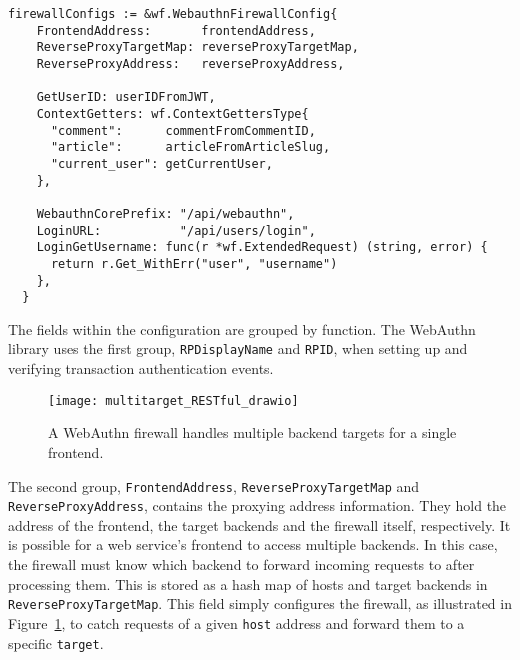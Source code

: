 \begin{lstlisting}[float=h,label=code:ConduitConfiguration,caption=The firewall configuration for the Conduit web service.]
  firewallConfigs := &wf.WebauthnFirewallConfig{
    FrontendAddress:       frontendAddress,
    ReverseProxyTargetMap: reverseProxyTargetMap,
    ReverseProxyAddress:   reverseProxyAddress,

    GetUserID: userIDFromJWT,
    ContextGetters: wf.ContextGettersType{
      "comment":      commentFromCommentID,
      "article":      articleFromArticleSlug,
      "current_user": getCurrentUser,
    },

    WebauthnCorePrefix: "/api/webauthn",
    LoginURL:           "/api/users/login",
    LoginGetUsername: func(r *wf.ExtendedRequest) (string, error) {
      return r.Get_WithErr("user", "username")
    },
  }
\end{lstlisting}

The fields within the configuration are grouped by function. The WebAuthn library uses the first group, \lstinline{RPDisplayName} and \lstinline{RPID}, when setting up and verifying transaction authentication events. 

\begin{figure}[h]
  \centering
  \texttt{[image: multitarget\_RESTful\_drawio]}
  \caption{A WebAuthn firewall handles multiple backend targets for a single frontend.}
  \label{Fig:MultiTargetRESTful}
\end{figure}

The second group, \lstinline{FrontendAddress}, \lstinline{ReverseProxyTargetMap} and \lstinline{ReverseProxyAddress}, contains the proxying address information. They hold the address of the frontend, the target backends and the firewall itself, respectively. It is possible for a web service's frontend to access multiple backends. In this case, the firewall must know which backend to forward incoming requests to after processing them. This is stored as a hash map of hosts and target backends in \lstinline{ReverseProxyTargetMap}. This field simply configures the firewall, as illustrated in Figure~\ref{Fig:MultiTargetRESTful}, to catch requests of a given \lstinline{host} address and forward them to a specific \lstinline{target}.


